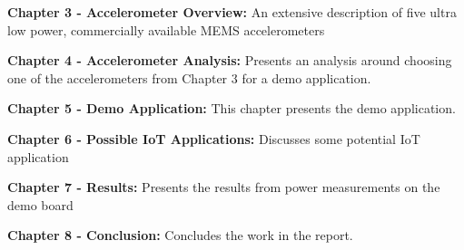 \textbf{Chapter 3 - Accelerometer Overview:} An extensive description of five ultra low power, commercially available MEMS accelerometers

\textbf{Chapter 4 - Accelerometer Analysis:} Presents an analysis around choosing one of the accelerometers from Chapter 3 for a demo application.

\textbf{Chapter 5 - Demo Application:} This chapter presents the demo application.

\textbf{Chapter 6 - Possible IoT Applications:} Discusses some potential IoT application

\textbf{Chapter 7 - Results:} Presents the results from power measurements on the demo board

\textbf{Chapter 8 - Conclusion:} Concludes the work in the report.

